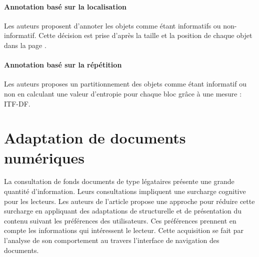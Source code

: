 \documentclass[10pt,a4paper]{article}
\begin{document}
\paragraph*{Annotation basé sur la localisation} Les auteurs proposent d'annoter les objets comme étant informatifs ou non-informatif. Cette décision est prise d'après la taille et la position de chaque objet dans la page \cite{wininformative}. 

\paragraph*{Annotation basé sur la répétition} Les auteurs proposes un partitionnement des objets comme étant informatif ou non en calculant une valeur d'entropie pour chaque bloc \cite{lin2002discovering} grâce à une mesure : ITF-DF.
\

\section{Adaptation de documents numériques}
La consultation de fonds documents de type légataires présente une grande quantité d'information. Leurs consultations impliquent une surcharge cognitive pour les lecteurs. Les auteurs de l'article \cite{zayani2010adaptation} propose une approche pour réduire cette surcharge en appliquant des adaptations de structurelle et de présentation du contenu suivant les préférences des utilisateurs. Ces préférences prennent en compte les informations qui intéressent le lecteur. Cette acquisition se fait par l'analyse de son comportement au travers l'interface de navigation des documents. 




\end{document}
